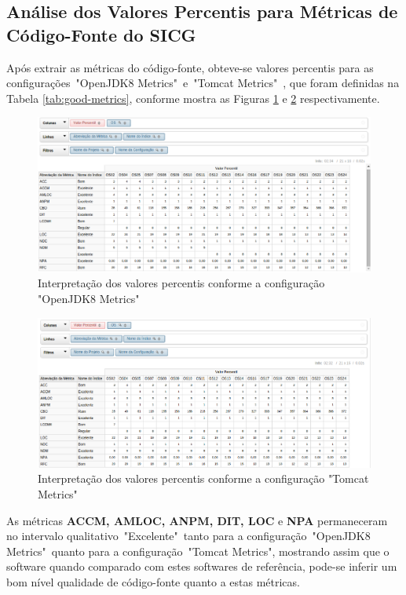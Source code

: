 \subsection{Análise dos Valores Percentis para Métricas de Código-Fonte do SICG}

Após extrair as métricas do código-fonte, obteve-se valores percentis para as configurações~"OpenJDK8 Metrics"~e~"Tomcat Metrics"~, que foram definidas na Tabela \ref{tab:good-metrics}, conforme mostra as Figuras \ref{fig:total-openJDK8} e \ref{fig:total-tomcat}   
respectivamente.

\begin{figure}
\centering
\includegraphics[keepaspectratio=true,scale=0.7]{figuras/total-OpenJDK.eps}
\caption{Interpretação dos valores percentis conforme a configuração "OpenJDK8 Metrics"}
\label{fig:total-openJDK8}
\end{figure}
\FloatBarrier

\begin{figure}
\centering
\includegraphics[keepaspectratio=true,scale=0.7]{figuras/total-tomcat.eps}
\caption{Interpretação dos valores percentis conforme a configuração "Tomcat Metrics"}
\label{fig:total-tomcat}
\end{figure}
\FloatBarrier

As métricas \textbf{ACCM, AMLOC, ANPM, DIT, LOC} e \textbf{NPA} permaneceram no intervalo qualitativo~"Excelente"~tanto para a configuração~"OpenJDK8 Metrics"~quanto para a configuração~"Tomcat Metrics", mostrando assim que o software quando comparado com estes softwares de referência, pode-se inferir um bom nível qualidade de código-fonte quanto a estas métricas.

